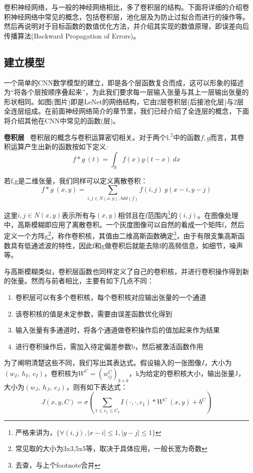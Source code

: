 卷积神经网络，与一般的神经网络相比，多了卷积层的结构。下面将详细的介绍卷积神经网络中常见的概念，包括卷积层，池化层及为防止过拟合而进行的操作等。然后再说明对于目标函数的数值优化方法，并介绍其实现的数值原理，即误差向后传播算法(Backward Propagation of Errors)。

\subsection{建立模型}

一个简单的CNN数学模型的建立，即是各个层函数复合而成，这可以形象的描述为“将各个层按顺序叠起来”，为此我们要求每一层输入张量与其上一层输出张量的形状相同。如图(图片)即是LeNet的网络结构，它由2层卷积层(后接池化层)与2层全连层组成。在前面神经网络简介的章节里，我们已经介绍了全连层的概念，下面将介绍其他在CNN中常见的函数(层)。

\textbf{卷积层} \ 卷积层的概念与卷积运算密切相关。对于两个$\mathbb{L}^2$中的函数$f,g$而言，其卷积运算产生出新的函数按如下定义:
\[
	f * g \ (t) = \int_{\mathbb{R}} f(x) g(t-x) \  dx
\]

若f,g是二维张量，我们同样可以定义离散卷积：
\[
	f * g \ (x, y) = \sum_{i, j \in N(x,y), bdd(f)} f(i,j) \ g(x-i, y-j)
\]

这里$i,j \in N(x,y)$表示所有与$(x,y)$相邻且在f范围内\footnote{严格来讲为，$\{ \forall (i,j),|x-i| \le 1, |y-j| \le 1 \}$}的$(i,j)$。在图像处理中，高斯模糊即应用了离散卷积。一个灰度图像可以自然的看成一个矩阵f，然后定义一个方阵g\footnote{常见取的大小为3x3,5x5等，取决于具体应用，一般长宽为奇数}，称作卷积核，其值由二维高斯函数确定\footnote{去查，与上个footnote合并}，由于有限支集高斯函数具有低通滤波的特性，因此f和g做卷积后就能去除f的高频信息，如细节，噪声等。

与高斯模糊类似，卷积层函数也同样定义了自己的卷积核，并进行卷积操作得到新的张量。然而与前者相比，主要有如下几点不同：
\begin{enumerate}
	\item 卷积层可以有多个卷积核，每个卷积核对应输出张量的一个通道
	\item 该卷积核的值是未定参数，需要由误差函数优化得到
	\item 输入张量有多通道时，将各个通道做卷积操作后的值加起来作为结果
	\item 进行卷积操作后，需加入待定偏差参数b，然后被激活函数作用
\end{enumerate}

为了阐明清楚这些不同，我们写出其表达式。假设输入的一张图像$I$，大小为$(w_I, \ h_I, \ c_I)$，卷积核为$W^C = {(w^C_{ij})}_{k \times k}$，k为给定的卷积核大小，输出张量J，大小为$(w_J, \ h_J, \ c_J)$，则有如下表达式：
\[
	J(x,y,C) = \sigma(\sum_{1 \le c_1 \le C_I} I(\cdot, \cdot, c_1) * W^C \ (x,y) + b^C)
\]

